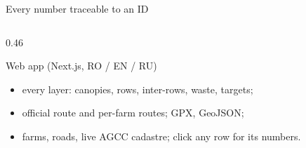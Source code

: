 \begin{frame}{Every number traceable to an ID}
\begin{columns}[T]
\begin{column}{0.46\textwidth}
\begin{sxcard}{Web app (Next.js, RO / EN / RU)}
\begin{itemize}
          \item every layer: canopies, rows, inter-rows, waste, targets;
          \item official route and per-farm routes; GPX, GeoJSON;
          \item farms, roads, live AGCC cadastre; click any row for its numbers.
        \end{itemize}
      \end{sxcard}
      \par\vspace{1.5mm}
      \begin{sxexample}
        \hfill
        \hfill
        \\[1.2mm]
        \hfill
        \hfill
      \end{sxexample}
    \end{column}
  \end{columns}
\end{frame}

